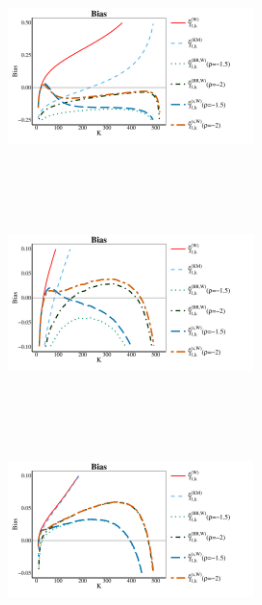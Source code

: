 \begin{landscape}
\begin{figure}[h]
	\centering
	\begin{subfigure}[h]{0.3\linewidth}
		\includegraphics[width=6.5cm,height=5.5cm]{./plots/paper2/zoomBias_simulations_B12_W.pdf}
	\end{subfigure}
	\hspace{\fill}
	\begin{subfigure}[h]{0.3\linewidth}
		\includegraphics[width=6.5cm,height=5.5cm]{./plots/paper2/zoomBias_simulations_B11_W.pdf}
	\end{subfigure}
	\hspace{\fill}
	\begin{subfigure}[h]{0.3\linewidth}
		\includegraphics[width=6.5cm,height=5.5cm]{./plots/paper2/zoomBias_simulations_B21_W.pdf}
	\end{subfigure}
	\hspace{\fill}
	\begin{subfigure}[h]{0.3\linewidth}

\end{subfigure}
\end{figure}
\end{landscape}

